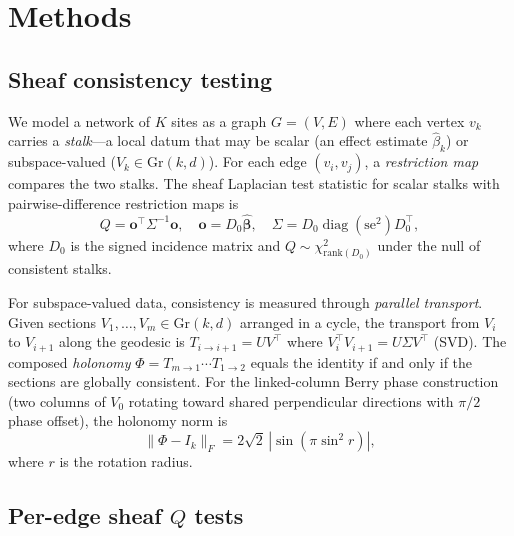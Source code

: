 \documentclass[11pt]{article}
\newcommand{\Gr}{\mathrm{Gr}}
\begin{document}
\section{Methods}
\label{sec:methods}

\subsection{Sheaf consistency testing}
\label{sec:meth-sheaf}

We model a network of $K$ sites as a graph $G = (V, E)$ where each vertex $v_k$ carries a \emph{stalk}---a local datum that may be scalar (an effect estimate $\hat\beta_k$) or subspace-valued ($V_k \in \Gr(k,d)$).
For each edge $(v_i, v_j)$, a \emph{restriction map} compares the two stalks.
The sheaf Laplacian test statistic for scalar stalks with pairwise-difference restriction maps is
\begin{equation}
    Q = \mathbf{o}^\top \Sigma^{-1} \mathbf{o}, \quad
    \mathbf{o} = D_0 \boldsymbol{\hat\beta}, \quad
    \Sigma = D_0 \operatorname{diag}(\mathrm{se}^2) D_0^\top,
    \label{eq:sheaf-Q}
\end{equation}
where $D_0$ is the signed incidence matrix and $Q \sim \chi^2_{\mathrm{rank}(D_0)}$ under the null of consistent stalks.

For subspace-valued data, consistency is measured through \emph{parallel transport}.
Given sections $V_1, \ldots, V_m \in \Gr(k,d)$ arranged in a cycle, the transport from $V_i$ to $V_{i+1}$ along the geodesic is $T_{i \to i+1} = U V^\top$ where $V_i^\top V_{i+1} = U \Sigma V^\top$ (SVD).
The composed \emph{holonomy} $\Phi = T_{m \to 1} \cdots T_{1 \to 2}$ equals the identity if and only if the sections are globally consistent.
For the linked-column Berry phase construction (two columns of $V_0$ rotating toward shared perpendicular directions with $\pi/2$ phase offset), the holonomy norm is
\begin{equation}\label{eq:berry}
    \|\Phi - I_k\|_F = 2\sqrt{2}\,|\sin(\pi \sin^2 r)|,
\end{equation}
where $r$ is the rotation radius.

\subsection{Per-edge sheaf $Q$ tests}
\label{sec:meth-peredge}
\end{document}
